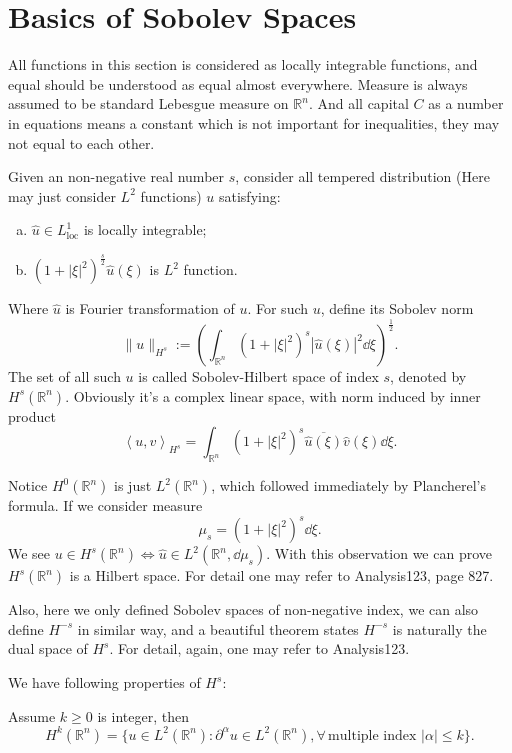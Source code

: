\documentclass[UTF8,12pt]{article}
\numberwithin{theorem}{section}
\numberwithin{equation}{section}
\begin{document}
\section{Basics of Sobolev Spaces}
All functions in this section is considered as locally integrable functions, and
equal should be understood as equal almost everywhere. Measure is always assumed to
be standard Lebesgue measure on \(\mathbb{R}^n\). And all capital \(C\) as a number
in equations means a constant which is not important for inequalities, they may not
equal to each other.
\begin{definition}
    Given an non-negative real number \(s\), consider all tempered distribution
    (Here may just consider \(L^2\) functions) \(u\) satisfying:
    \begin{enumerate}[(a)]
        \item \(\hat{u}\in L_{\text{loc}}^1\) is locally integrable;
        \item \((1+|\xi|^2)^{\frac{s}{2}}\hat{u}(\xi)\) is \(L^2\) function.
    \end{enumerate}
    Where \(\hat{u}\) is Fourier transformation of \(u\).
    For such \(u\), define its Sobolev norm \[
        \|u\|_{H^s}:=\left(\int_{\mathbb{R}^n} (1+|\xi|^2)^s|\hat{u}(\xi)|^2
        \dd{\xi}\right)^{\frac{1}{2}}
    .\] The set of all such \(u\) is called Sobolev-Hilbert space of index \(s\),
    denoted by \(H^s(\mathbb{R}^n)\). Obviously it's a complex linear space,
    with norm induced by inner product \[
        \left<u,v\right>_{H^s}=\int_{\mathbb{R}^n}(1+|\xi|^2)^s
        \overline{\hat{u}(\xi)}\hat{v}(\xi)\dd{\xi}
    .\]
\end{definition}
Notice \(H^0(\mathbb{R}^n)\) is just \(L^2(\mathbb{R}^n)\), which followed
immediately by Plancherel's formula. If we consider measure \[
    \mu_s=(1+|\xi|^2)^{s}\dd{\xi}
.\] We see \(u\in H^s(\mathbb{R}^n)\iff \hat{u}\in L^2(\mathbb{R}^n,\dd{\mu_s})\).
With this observation we can prove \(H^s(\mathbb{R}^n)\) is a Hilbert space. For
detail one may refer to Analysis123, page 827.

Also, here we only defined Sobolev spaces of non-negative index, we can also define
\(H^{-s}\) in similar way, and a beautiful theorem states \(H^{-s}\) is naturally
the dual space of \(H^s\). For detail, again, one may refer to Analysis123.

\hfill

We have following properties of \(H^s\):
\begin{prop}\hfill\par
    Assume \(k\ge 0\) is integer, then \[
        H^k(\mathbb{R}^n)=\{u\in L^2(\mathbb{R}^n):\partial^\alpha
        u\in L^2(\mathbb{R}^n), \forall\,\text{multiple index }|\alpha|\le k\}
    .\] 
\end{prop}
\end{document}

